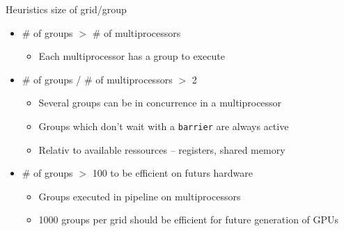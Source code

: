 \documentclass{beamer}
\begin{document}
\begin{frame}{Heuristics size of grid/group}

  \begin{itemize}
  \item \# of groups $>$ \# of multiprocessors
    \begin{itemize}
    \item Each multiprocessor has a group to execute
    \end{itemize}
  \item \# of groups / \# of multiprocessors $>$ 2
    \begin{itemize}
    \item Several groups can be in concurrence in a multiprocessor
    \item Groups which don't wait with a \texttt{barrier} are always active
    \item Relativ to available ressources -- registers, shared memory
    \end{itemize}
  \item \# of groups $>$ 100 to be efficient on futurs hardware
    \begin{itemize}
    \item Groups executed in pipeline on multiprocessors
    \item 1000 groups per grid should be efficient for future generation of GPUs
    \end{itemize}
  \end{itemize}
\end{frame}
\end{document}
